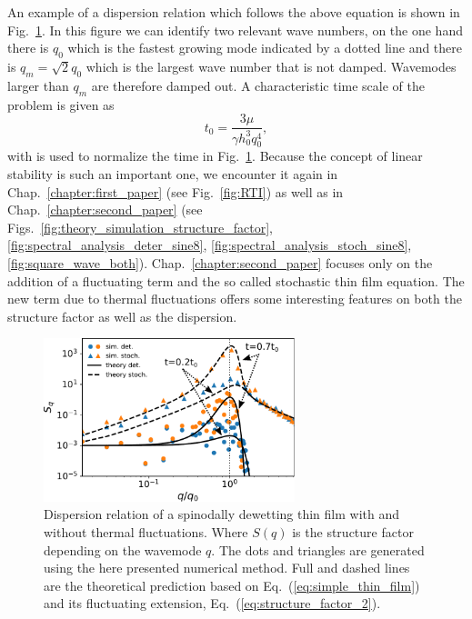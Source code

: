An example of a dispersion relation which follows the above equation is shown in Fig.~\ref{fig:dispertion_1}.
In this figure we can identify two relevant wave numbers, on the one hand there is $q_0$ which is the fastest growing mode indicated by a dotted line and there is $q_m = \sqrt{2}q_0$ which is the largest wave number that is not damped.
Wavemodes larger than $q_m$ are therefore damped out.
A characteristic time scale of the problem is given as
\begin{equation}
    t_0 = \frac{3\mu}{\gamma h_0^3 q_0^4},
\end{equation}
with is used to normalize the time in Fig.~\ref{fig:dispertion_1}.
Because the concept of linear stability is such an important one, we encounter it again in Chap.~\ref{chapter:first_paper} (see Fig.~\ref{fig:RTI}) as well as in Chap.~\ref{chapter:second_paper} (see Figs.~\ref{fig:theory_simulation_structure_factor}, \ref{fig:spectral_analysis_deter_sine8}, \ref{fig:spectral_analysis_stoch_sine8}, \ref{fig:square_wave_both}).
Chap.~\ref{chapter:second_paper} focuses only on the addition of a fluctuating term and the so called stochastic thin film equation.
The new term due to thermal fluctuations offers some interesting features on both the structure factor as well as the dispersion.

\begin{figure}
    \centering
    \includegraphics[width=0.65\textwidth]{graphics/spectratheta20.pdf}
    \caption{Dispersion relation of a spinodally dewetting thin film with and without thermal fluctuations.
    Where $S(q)$ is the structure factor depending on the wavemode $q$.
    The dots and triangles are generated using the here presented numerical method. 
    Full and dashed lines are the theoretical prediction based on Eq.~(\ref{eq:simple_thin_film}) and its fluctuating extension, Eq.~(\ref{eq:structure_factor_2}).
    }
    \label{fig:dispertion_1}
\end{figure}

